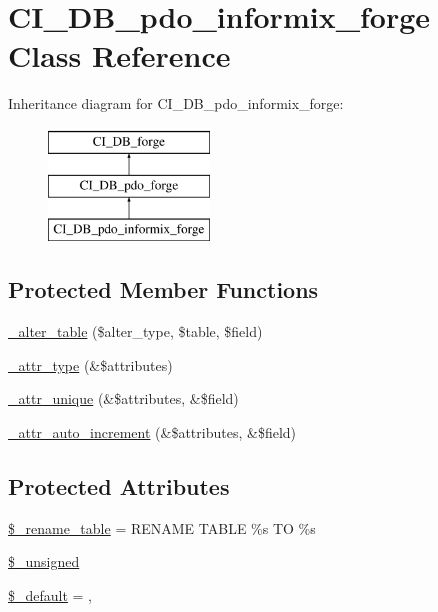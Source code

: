 \hypertarget{class_c_i___d_b__pdo__informix__forge}{}\section{C\+I\+\_\+\+D\+B\+\_\+pdo\+\_\+informix\+\_\+forge Class Reference}
\label{class_c_i___d_b__pdo__informix__forge}
Inheritance diagram for C\+I\+\_\+\+D\+B\+\_\+pdo\+\_\+informix\+\_\+forge\+:\begin{figure}[H]
\begin{center}
\leavevmode
\includegraphics[height=3.000000cm]{class_c_i___d_b__pdo__informix__forge}
\end{center}
\end{figure}
\subsection*{Protected Member Functions}
\begin{DoxyCompactItemize}
\item 
\hyperlink{class_c_i___d_b__pdo__informix__forge_a41c6cae02f2fda8b429ad0afb9509426}{\+\_\+alter\+\_\+table} (\$alter\+\_\+type, \$table, \$field)
\item 
\hyperlink{class_c_i___d_b__pdo__informix__forge_a8553be952084c6f7cdfff370a1d14f6b}{\+\_\+attr\+\_\+type} (\&\$attributes)
\item 
\hyperlink{class_c_i___d_b__pdo__informix__forge_a7568a93ea53a7392a63fffe83bb7a090}{\+\_\+attr\+\_\+unique} (\&\$attributes, \&\$field)
\item 
\hyperlink{class_c_i___d_b__pdo__informix__forge_a2a013a5932439c3c44f0dad3436525f7}{\+\_\+attr\+\_\+auto\+\_\+increment} (\&\$attributes, \&\$field)
\end{DoxyCompactItemize}
\subsection*{Protected Attributes}
\begin{DoxyCompactItemize}
\item 
\hyperlink{class_c_i___d_b__pdo__informix__forge_a1a649e7cf9de16bcf932977b18bc91de}{\$\+\_\+rename\+\_\+table} = \textquotesingle{}R\+E\+N\+A\+M\+E T\+A\+B\+L\+E \%s T\+O \%s\textquotesingle{}
\item 
\hyperlink{class_c_i___d_b__pdo__informix__forge_aae977ae6d61fa183f0b25422b6ddc31c}{\$\+\_\+unsigned}
\item 
\hyperlink{class_c_i___d_b__pdo__informix__forge_aa119e1b4e3d00f47a7b83b7066087915}{\$\+\_\+default} = \textquotesingle{}, \textquotesingle{}
\end{DoxyCompactItemize}
